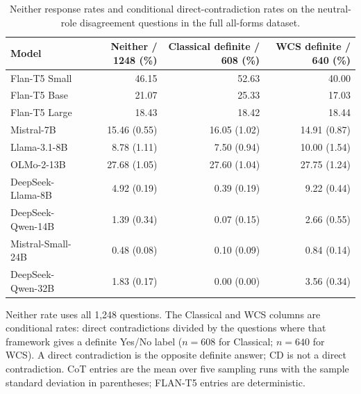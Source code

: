 \begin{table}[htbp]
\centering
\scriptsize
\setlength{\tabcolsep}{4pt}
\caption{Neither response rates and conditional direct-contradiction rates on the neutral-role disagreement questions in the full all-forms dataset.}
\label{tab:neither-direct-contradictions-final2}
\begin{tabular}{lrrr}
\toprule
Model & Neither / 1248 (\%) & Classical definite / 608 (\%) & WCS definite / 640 (\%) \\
\midrule
Flan-T5 Small & 46.15 & 52.63 & 40.00 \\
Flan-T5 Base & 21.07 & 25.33 & 17.03 \\
Flan-T5 Large & 18.43 & 18.42 & 18.44 \\
Mistral-7B & 15.46 (0.55) & 16.05 (1.02) & 14.91 (0.87) \\
Llama-3.1-8B & 8.78 (1.11) & 7.50 (0.94) & 10.00 (1.54) \\
OLMo-2-13B & 27.68 (1.05) & 27.60 (1.04) & 27.75 (1.24) \\
DeepSeek-Llama-8B & 4.92 (0.19) & 0.39 (0.19) & 9.22 (0.44) \\
DeepSeek-Qwen-14B & 1.39 (0.34) & 0.07 (0.15) & 2.66 (0.55) \\
Mistral-Small-24B & 0.48 (0.08) & 0.10 (0.09) & 0.84 (0.14) \\
DeepSeek-Qwen-32B & 1.83 (0.17) & 0.00 (0.00) & 3.56 (0.34) \\
\bottomrule
\end{tabular}
\vspace{2pt}
\begin{minipage}{\linewidth}
\scriptsize Neither rate uses all 1,248 questions. The Classical and WCS columns are conditional rates: direct contradictions divided by the questions where that framework gives a definite Yes/No label ($n=608$ for Classical; $n=640$ for WCS). A direct contradiction is the opposite definite answer; CD is not a direct contradiction. CoT entries are the mean over five sampling runs with the sample standard deviation in parentheses; FLAN-T5 entries are deterministic.
\end{minipage}
\end{table}
